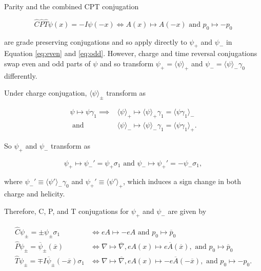 \documentclass{article}
\begin{document}
  Parity and the combined CPT conjugation

  \begin{equation}
    \hat C \hat P \hat T \psi(x) = -I \psi(-x) \iff A(x) \mapsto A(-x) \text{ and } p_0 \mapsto -p_0 \label{eq:cpt}
  \end{equation}

  are grade preserving conjugations and so apply directly to $\psi_+$ and $\psi_-$ in Equation \ref{eq:even} and \ref{eq:odd}. However, charge and time reversal conjugations swap even and odd parts of $\psi$ and so transform $\psi_+ = \langle \psi \rangle_+$ and $\psi_- = \langle \psi \rangle_- \gamma_0$ differently.

  Under charge conjugation, $\langle \psi \rangle_\pm$ transform as

  \begin{align}
    \psi \mapsto \psi \gamma_1 \implies 
    &\langle \psi \rangle_+ \mapsto \langle \psi \rangle_+ \gamma_1 = \langle \psi \gamma_1 \rangle_- \\
    \text{ and } 
    &\langle \psi \rangle_- \mapsto \langle \psi \rangle_- \gamma_1 = \langle \psi \gamma_1 \rangle_+.
  \end{align}

  So $\psi_+$ and $\psi_-$ transform as

  \begin{equation}
    \psi_+ \mapsto \psi_-' = \psi_+ \sigma_1
    \text{ and } 
    \psi_- \mapsto \psi_+' = - \psi_- \sigma_1,
  \end{equation}

  where $\psi_-' \equiv \langle \psi' \rangle_- \gamma_0$ and $\psi_+' \equiv \langle \psi' \rangle_+$, which induces a sign change in both charge and helicity.

  Therefore, C, P, and T conjugations for $\psi_+$ and $\psi_-$ are given by

  \begin{align}
    \hat C \psi_\pm = \pm \psi_\pm \sigma_1 &\iff eA \mapsto - eA \text{ and } p_0 \mapsto \overline p_0 \label{eq:pmcharge}\\
    \hat P \psi_\pm = \overline \psi_\pm(\overline x) &\iff \nabla \mapsto \overline \nabla, eA(x) \mapsto e\overline A(\overline x), \text{ and } p_0 \mapsto \overline p_0 \label{eq:pmparity}\\
    \hat T \psi_\pm = \mp I \overline \psi_\pm(-\overline x) \sigma_1 &\iff \nabla \mapsto \overline\nabla, eA(x) \mapsto -e\overline A(-\overline x), \text{ and } p_0 \mapsto - p_0.\label{eq:pmtime}
  \end{align}
\end{document}
